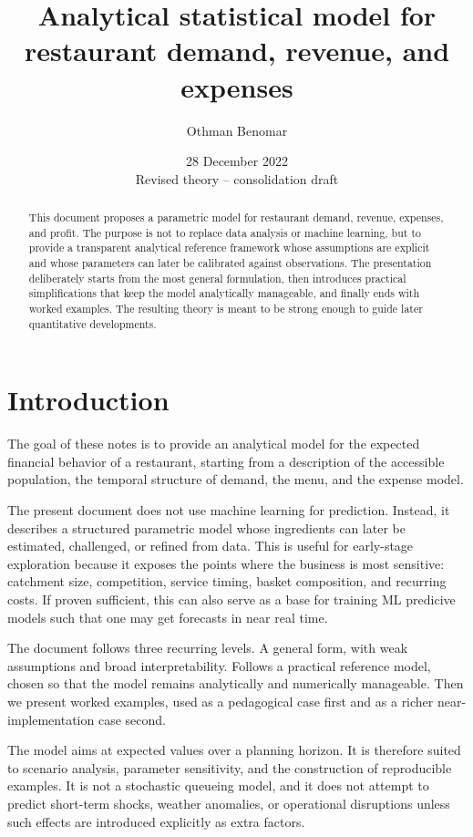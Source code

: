 \documentclass{article}
\title{Analytical statistical model for restaurant demand, revenue, and expenses}
\date{28 December 2022\\Revised theory -- consolidation draft}
\author{Othman Benomar}
\begin{document}
\maketitle

\begin{abstract}
This document proposes a parametric model for restaurant demand, revenue, expenses, and profit. The purpose is not to replace data analysis or machine learning, but to provide a transparent analytical reference framework whose assumptions are explicit and whose parameters can later be calibrated against observations. The presentation deliberately starts from the most general formulation, then introduces practical simplifications that keep the model analytically manageable, and finally ends with worked examples. The resulting theory is meant to be strong enough to guide later quantitative developments.
\end{abstract}

\section{Introduction}
\label{sec:introduction}

The goal of these notes is to provide an analytical model for the expected financial behavior of a restaurant, starting from a description of the accessible population, the temporal structure of demand, the menu, and the expense model.

The present document does not use machine learning for prediction. Instead, it describes a structured parametric model whose ingredients can later be estimated, challenged, or refined from data. This is useful for early-stage exploration because it exposes the points where the business is most sensitive: catchment size, competition, service timing, basket composition, and recurring costs. If proven sufficient, this can also serve as a base for training ML predicive models such that one may get forecasts in near real time.

The document follows three recurring levels. A general form, with weak assumptions and broad interpretability.
Follows a practical reference model, chosen so that the model remains analytically and numerically manageable. Then we present worked examples, used as a pedagogical case first and as a richer near-implementation case second.

The model aims at expected values over a planning horizon. It is therefore suited to scenario analysis, parameter sensitivity, and the construction of reproducible examples. It is not a stochastic queueing model, and it does not attempt to predict short-term shocks, weather anomalies, or operational disruptions unless such effects are introduced explicitly as extra factors.
\end{document}
